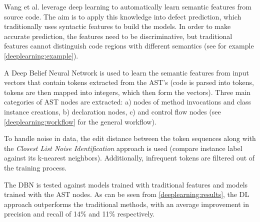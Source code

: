  Wang et al. \cite{predict_deeplearning} leverage deep learning to automatically learn semantic features from source code. The aim is to apply this knowledge into defect prediction, which traditionally uses syntactic features to build the models. In order to make accurate prediction, the features need to be discriminative, but traditional features cannot distinguish code regions with different semantics (see for example \cref{deeplearning:example}).

 A Deep Belief Neural Network is used to learn the semantic features from input vectors that contain tokens extracted from the AST's (code is parsed into tokens, tokens are then mapped into integers, which then form the vectors). Three main categories of AST nodes are extracted: a) nodes of method invocations and class instance creations, b) declaration nodes, c) and control flow nodes (see \cref{deeplearning:workflow} for the general workflow).

 To handle noise in data, the edit distance between the token sequences along with the \textit{Closest List Noise Identification} approach is used (compare instance label against its k-nearest neighbors). Additionally, infrequent tokens are filtered out of the training process.

 The DBN is tested against models trained with traditional features and models trained with the AST nodes. As can be seen from \cref{deeplearning:results}, the DL approach outperforms the traditional methods, with an average improvement in precision and recall of 14\% and 11\% respectively.

